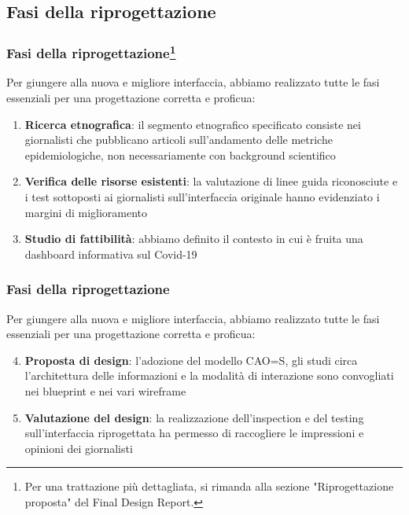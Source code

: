 
\subsection{Fasi della riprogettazione}

\begin{frame}
    \frametitle{Fasi della riprogettazione\footnote{Per una trattazione più dettagliata, si rimanda alla sezione "Riprogettazione proposta" del Final Design Report.}}
    Per giungere alla nuova e migliore interfaccia, abbiamo realizzato tutte le fasi essenziali per una progettazione corretta e proficua:
    \begin{enumerate}
        \item<1-> \textbf{Ricerca etnografica}: il segmento etnografico specificato consiste nei giornalisti che pubblicano articoli sull'andamento delle metriche epidemiologiche, non necessariamente con background scientifico
        \item<2-> \textbf{Verifica delle risorse esistenti}: la valutazione di linee guida riconosciute e i test sottoposti ai giornalisti sull'interfaccia originale hanno evidenziato i margini di miglioramento
        \item<3->  \textbf{Studio di fattibilità}: abbiamo definito il contesto in cui è fruita una dashboard informativa sul Covid-19
    \end{enumerate}  

\end{frame}

\begin{frame}
    \frametitle{Fasi della riprogettazione}
    Per giungere alla nuova e migliore interfaccia, abbiamo realizzato tutte le fasi essenziali per una progettazione corretta e proficua: 
    \begin{enumerate}
        \setcounter{enumi}{3}
        \item<1-> \textbf{Proposta di design}: l'adozione del modello CAO=S, gli studi circa l'architettura delle informazioni e la modalità di interazione sono convogliati nei blueprint e nei vari wireframe
        \item<2-> \textbf{Valutazione del design}: la realizzazione dell'inspection e del testing sull'interfaccia riprogettata ha permesso di raccogliere le impressioni e opinioni dei giornalisti
    \end{enumerate}  

\end{frame}